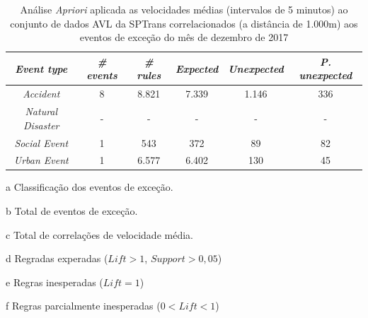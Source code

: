 \documentclass[
	12pt,				%
	oneside,			%
	a4paper,			%
	english,			%
	brazil				%
	]{abntex2ppgsi}
\begin{document}
\begin{apendicesenv}
\begin{table}[!htb]
\centering
\begin{threeparttable}
\caption {Análise \textit{Apriori} aplicada as velocidades médias (intervalos de 5 minutos) ao conjunto de dados AVL da SPTrans correlacionados (a distância de 1.000m) aos eventos de exceção do mês de dezembro de 2017}
\label {tab:aprioriFull}
\begin{tabular}{c|c|c|c|c|c}
\hline
\textbf{\textit{Event type}}\tnote{a} & \textbf{\textit{\# events}}\tnote{b} & \textit{\textbf{\# rules}}\tnote{c} & \textbf{\textit{Expected}}\tnote{d} & \textbf{\textit{Unexpected}}\tnote{e} & \textbf{\textit{P. unexpected}}\tnote{f}   \\
\hline
\textit{Accident} & 8 & 8.821 & 7.339 & 1.146 & 336 \\
\textit{Natural Disaster} & - & - & - & - & - \\
\textit{Social Event} & 1 & 543 & 372 & 89 & 82 \\
\textit{Urban Event} & 1 & 6.577 & 6.402 & 130 & 45 \\
\hline
\end{tabular}
\begin{tablenotes}
            \item[a] Classificação dos eventos de exceção.
            \item[b] Total de eventos de exceção.
            \item[c] Total de correlações de velocidade média.
            \item[d] Regradas experadas ($Lift > 1$, $Support > 0,05$)
            \item[e] Regras inesperadas ($Lift = 1$)
            \item[f] Regras parcialmente inesperadas ($0 < Lift < 1$)
        \end{tablenotes}
\end{threeparttable}
\end{table}


\end{apendicesenv}
\end{document}
